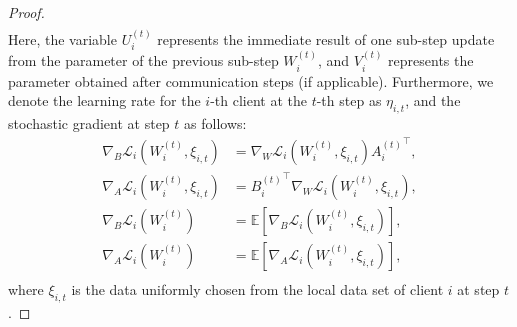 \begin{proof}
\begin{equation*}
\begin{aligned}
\end{aligned}
\end{equation*}
Here, the variable $U_i^{(t)}$ represents the immediate result of one sub-step update from the parameter of the previous sub-step $W_i^{(t)}$, and $V_i^{(t)}$ represents the parameter obtained after communication steps (if applicable).
Furthermore, we denote the learning rate for the $i$-th client at the $t$-th step as $\eta_{i,t}$, and the stochastic gradient at step $t$ as follows:
\begin{equation*}
\begin{aligned}
\nabla_{B}\mathcal{L}_i(W_i^{(t)},\xi_{i,t}) &= \nabla_{W}\mathcal{L}_i(W_i^{(t)},\xi_{i,t}){A_i^{(t)}}^{\top}, \\
\nabla_{A}\mathcal{L}_i(W_i^{(t)},\xi_{i,t}) &= {B_i^{(t)}}^{\top}\nabla_{W}\mathcal{L}_i(W_i^{(t)},\xi_{i,t}), \\
\nabla_{B}\mathcal{L}_i(W_i^{(t)}) &= \mathbb{E}[\nabla_{B}\mathcal{L}_i(W_i^{(t)},\xi_{i,t})], \\
\nabla_{A}\mathcal{L}_i(W_i^{(t)}) &= \mathbb{E}[\nabla_{A}\mathcal{L}_i(W_i^{(t)},\xi_{i,t})], \\
\end{aligned}
\end{equation*}
where $\xi_{i,t}$ is the data uniformly chosen from the local data set of client $i$ at step $t$.


\end{proof}
